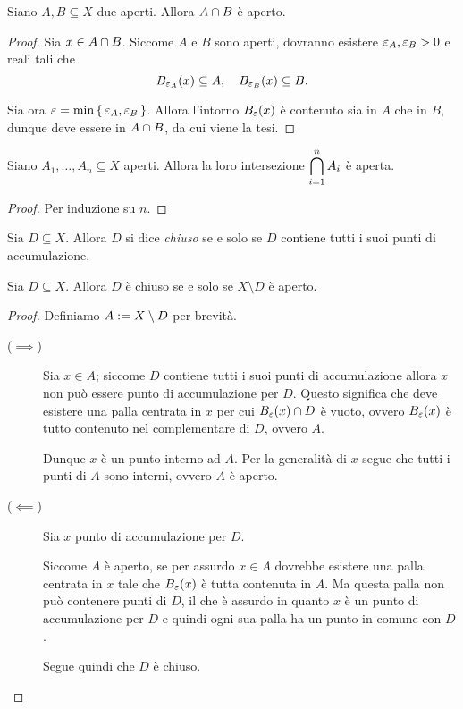 \begin{proposition}
    \label{prop:inters_aperti}
    Siano $A, B \subseteq X$ due aperti. Allora $A \inters B$ è aperto.
\end{proposition}
\begin{proof}
    Sia $x \in A \inters B$. Siccome $A$ e $B$ sono aperti, dovranno esistere $\eps_A, \eps_B > 0$ e reali tali che \[
        \oB[\eps_A]{x} \subseteq A, \quad \oB[\eps_B]{x} \subseteq B. 
    \]

    Sia ora $\eps = \min \set{\eps_A, \eps_B}$. Allora l'intorno $\oB{x}$ è contenuto sia in $A$ che in $B$, dunque deve essere in $A \inters B$, da cui viene la tesi.
\end{proof}
\begin{corollary}
     \label{cor:inters_aperti}
    Siano $A_1, \dots, A_n \subseteq X$ aperti. Allora la loro intersezione $\displaystyle \biginters_{i = 1}^n A_i$ è aperta. 
\end{corollary}
\begin{proof}
    Per induzione su $n$.
\end{proof}

\begin{definition}
     \label{def:chiuso}
    Sia $D \subseteq X$. Allora $D$ si dice \emph{chiuso} se e solo se $D$ contiene tutti i suoi punti di accumulazione.
\end{definition}

\begin{proposition}
     \label{prop:chiuso_sse_compl_aperto}
    Sia $D \subseteq X$. Allora $D$ è chiuso se e solo se $X \setminus D$ è aperto.
\end{proposition}
\begin{proof}
    Definiamo $A \deq X \setminus D$ per brevità.
    \begin{description}
        \item[($\implies$)] Sia $x \in A$; siccome $D$ contiene tutti i suoi punti di accumulazione allora $x$ non può essere punto di accumulazione per $D$. Questo significa che deve esistere una palla centrata in $x$ per cui $\oB{x} \inters D$ è vuoto, ovvero $\oB{x}$ è tutto contenuto nel complementare di $D$, ovvero $A$.
        
        Dunque $x$ è un punto interno ad $A$. Per la generalità di $x$ segue che tutti i punti di $A$ sono interni, ovvero $A$ è aperto.
        \item[($\impliedby$)] Sia $x$ punto di accumulazione per $D$. 
        
        Siccome $A$ è aperto, se per assurdo $x \in A$ dovrebbe esistere una palla centrata in $x$ tale che $\oB{x}$ è tutta contenuta in $A$. Ma questa palla non può contenere punti di $D$, il che è assurdo in quanto $x$ è un punto di accumulazione per $D$ e quindi ogni sua palla ha un punto in comune con $D$.

        Segue quindi che $D$ è chiuso. \qedhere
    \end{description}
\end{proof}


